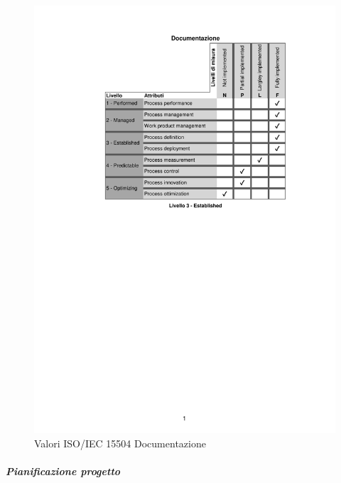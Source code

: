\begin{figure}[H]
	\centering
	\includegraphics[scale=1]{images/resoconto/RP/documentazione-RP.pdf}
	\caption{Valori ISO/IEC 15504 Documentazione}	
\end{figure}
\newpage
\subparagraph{Pianificazione progetto}
\noindent
